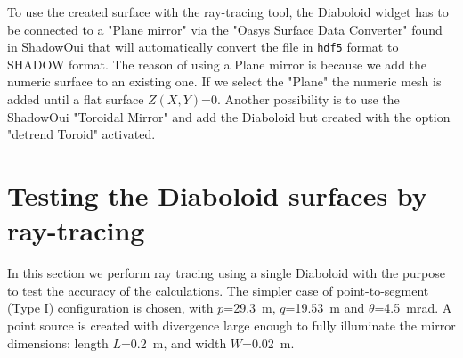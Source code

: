 \documentclass[a4paper, 11pt]{article}
\begin{document}
To use the created surface with the ray-tracing tool, the Diaboloid widget has to be connected to a "Plane mirror" via the "Oasys Surface Data Converter" found in ShadowOui that will automatically convert the file in {\tt hdf5} format to SHADOW format. The reason of using a Plane mirror is because we add the numeric surface to an existing one. If we select the "Plane" the numeric mesh is added until a flat surface $Z(X,Y)$=0. Another possibility is to use the ShadowOui "Toroidal Mirror" and add the Diaboloid but created with the option "detrend Toroid" activated.  

\section{Testing the Diaboloid surfaces by ray-tracing}
\label{sec:testing}

In this section we perform ray tracing using a single Diaboloid with the purpose to test the accuracy of the calculations. The simpler case of point-to-segment (Type I) configuration is chosen, with $p$=29.3~m, $q$=19.53~m and $\theta$=4.5~mrad. A point source is created with divergence large enough to fully illuminate the mirror dimensions: 
length $L$=0.2~m, and width $W$=0.02~m.
\end{document}
